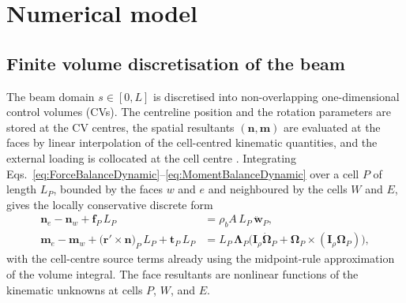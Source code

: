 \section{Numerical model}
\label{sec:numericalmodel}

\subsection{Finite volume discretisation of the beam}
\label{sec:beamFVDiscretisation}

\noindent
The beam domain $s\in[0,L]$ is discretised into non-overlapping one-dimensional control volumes (CVs). The centreline position and the rotation parameters are stored at the CV centres, the spatial resultants $(\mathbf{n},\mathbf{m})$ are evaluated at the faces by linear interpolation of the cell-centred kinematic quantities, and the external loading is collocated at the cell centre \citep{bali_cell-centered_2022}. Integrating Eqs.~\eqref{eq:ForceBalanceDynamic}--\eqref{eq:MomentBalanceDynamic} over a cell $P$ of length $L_{P}$, bounded by the faces $w$ and $e$ and neighboured by the cells $W$ and $E$, gives the locally conservative discrete form
\begin{align}
\mathbf{n}_{e} - \mathbf{n}_{w} + \mathbf{f}_{P}\,L_{P} &= \rho_{b}A\,L_{P}\,\ddot{\mathbf{w}}_{P}, \label{eq:fvForceBalance} \\
\mathbf{m}_{e} - \mathbf{m}_{w} + \bigl(\mathbf{r}'\times\mathbf{n}\bigr)_{P}\,L_{P} + \mathbf{t}_{P}\,L_{P} &= L_{P}\,\boldsymbol{\Lambda}_{P}\bigl(\mathbf{I}_{\rho}\dot{\boldsymbol{\Omega}}_{P} + \boldsymbol{\Omega}_{P}\times(\mathbf{I}_{\rho}\boldsymbol{\Omega}_{P})\bigr), \label{eq:fvMomentBalance}
\end{align}
with the cell-centre source terms already using the midpoint-rule approximation of the volume integral. The face resultants are nonlinear functions of the kinematic unknowns at cells $P$, $W$, and $E$.

